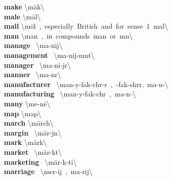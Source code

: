 \documentclass[10pt,a4paper]{article}
\begin{document}
\begin{multicols}{2}
\textbf{ make }\quad \textbackslash \textprimstress m\={a}k\textbackslash \\
\textbf{ male }\quad \textbackslash \textprimstress m\={a}l\textbackslash \\
\textbf{ mall }\quad \textbackslash \textprimstress m\.{o}l\ ,\ especially\ British\ and\ for\ sense\ 1\ \textprimstress mal\textbackslash \\
\textbf{ man }\quad \textbackslash \textprimstress man\ ,\ in\ compounds\ \textsecstress man\ or\ m\textschwa n\textbackslash \\
\textbf{ manage }\quad \ \textbackslash \textprimstress ma-nij\textbackslash \\
\textbf{ management }\quad \ \textbackslash \textprimstress ma-nij-m\textschwa nt\textbackslash \\
\textbf{ manager }\quad \ \textbackslash \textprimstress ma-ni-j\textschwa r\textbackslash \\
\textbf{ manner }\quad \ \textbackslash \textprimstress ma-n\textschwa r\textbackslash \\
\textbf{ manufacturer }\quad \ \textbackslash \textsecstress man-y\textschwa -\textprimstress fak-ch\textschwa r-\textschwa r\ ,\ -\textprimstress fak-shr\textschwa r,\ \textsecstress ma-n\textschwa -\textbackslash \\
\textbf{ manufacturing }\quad \ \textbackslash \textsecstress man-y\textschwa -\textprimstress fak-ch\textschwa r\ ,\ \textsecstress ma-n\textschwa -\textbackslash \\
\textbf{ many }\quad \textbackslash \textprimstress me-n\={e}\textbackslash \\
\textbf{ map }\quad \textbackslash \textprimstress map\textbackslash \\
\textbf{ march }\quad \textbackslash \textprimstress m\"{a}rch\textbackslash \\
\textbf{ margin }\quad \ \textbackslash \textprimstress m\"{a}r-j\textschwa n\textbackslash \\
\textbf{ mark }\quad \textbackslash \textprimstress m\"{a}rk\textbackslash \\
\textbf{ market }\quad \ \textbackslash \textprimstress m\"{a}r-k\textschwa t\textbackslash \\
\textbf{ marketing }\quad \ \textbackslash \textprimstress m\"{a}r-k\textschwa -ti\engma \textbackslash \\
\textbf{ marriage }\quad \ \textbackslash \textprimstress mer-ij\ ,\ \textprimstress ma-rij\textbackslash \\

\end{multicols}
\end{document}
